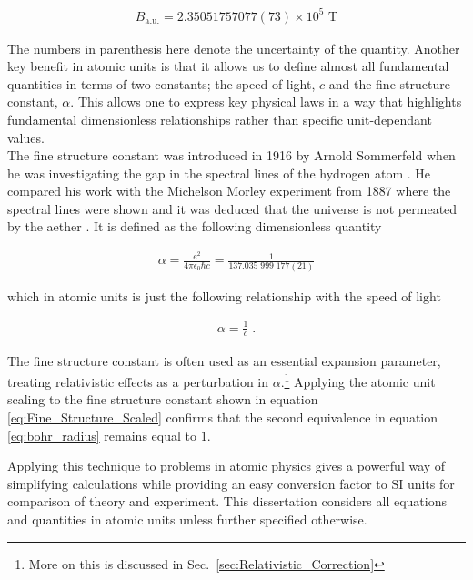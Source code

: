         \begin{align}
            B_{\text{a.u.}} = 2.35051757077(73) \times 10^5 \text{ T}
        \end{align}

        \noindent The numbers in parenthesis here denote the uncertainty of the quantity. Another key benefit in atomic units is that it allows us to define almost all fundamental quantities in terms of two constants; the speed of light, $c$ and the fine structure constant, $\alpha$. This allows one to express key physical laws in a way that highlights fundamental dimensionless relationships rather than specific unit-dependant values.\\

        The fine structure constant was introduced in 1916 by Arnold Sommerfeld when he was investigating the gap in the spectral lines of the hydrogen atom \cite{Sommerfeld_1916}. He compared his work with the Michelson Morley experiment from 1887 where the spectral lines were shown and it was deduced that the universe is not permeated by the aether \cite{Michelson_Morley_1887}. It is defined as the following dimensionless quantity

        \begin{align}
            \alpha = \frac{e^2}{4\pi \epsilon_0 \hbar c} = \frac{1}{137.035\;999\;177(21)}
        \end{align}

        \noindent which in atomic units is just the following relationship with the speed of light 

        \begin{align}
            \alpha = \frac{1}{c} \label{eq:Fine_Structure_Scaled}\;.
        \end{align}

        \noindent The fine structure constant is often used as an essential expansion parameter, treating relativistic effects as a perturbation in $\alpha$.\footnote{More on this is discussed in Sec.~\ref{sec:Relativistic_Correction}} Applying the atomic unit scaling to the fine structure constant shown in equation \eqref{eq:Fine_Structure_Scaled} confirms that the second equivalence in equation \eqref{eq:bohr_radius} remains equal to $1$. 

        Applying this technique to problems in atomic physics gives a powerful way of simplifying calculations while providing an easy conversion factor to SI units for comparison of theory and experiment. This dissertation considers all equations and quantities in atomic units unless further specified otherwise.


